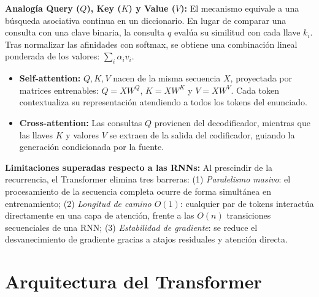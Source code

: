 \documentclass[10pt,letterpaper]{article}
\begin{document}
\textbf{Analogía Query ($Q$), Key ($K$) y Value ($V$):}
El mecanismo equivale a una búsqueda asociativa continua en un diccionario. En lugar de comparar una consulta con una clave binaria, la consulta $q$ evalúa su similitud con cada llave $k_i$. Tras normalizar las afinidades con softmax, se obtiene una combinación lineal ponderada de los valores: $\sum_i \alpha_i v_i$.
\begin{itemize}
    \item \textbf{Self-attention:} $Q, K, V$ nacen de la misma secuencia $X$, proyectada por matrices entrenables: $Q = X W^Q$, $K = X W^K$ y $V = X W^V$. Cada token contextualiza su representación atendiendo a todos los tokens del enunciado.
    \item \textbf{Cross-attention:} Las consultas $Q$ provienen del decodificador, mientras que las llaves $K$ y valores $V$ se extraen de la salida del codificador, guiando la generación condicionada por la fuente.
\end{itemize}

\textbf{Limitaciones superadas respecto a las RNNs:}
Al prescindir de la recurrencia, el Transformer elimina tres barreras: (1) \textit{Paralelismo masivo}: el procesamiento de la secuencia completa ocurre de forma simultánea en entrenamiento; (2) \textit{Longitud de camino $O(1)$}: cualquier par de tokens interactúa directamente en una capa de atención, frente a las $O(n)$ transiciones secuenciales de una RNN; (3) \textit{Estabilidad de gradiente}: se reduce el desvanecimiento de gradiente gracias a atajos residuales y atención directa.

\section{Arquitectura del Transformer}
\label{sec:arquitectura}
\end{document}
